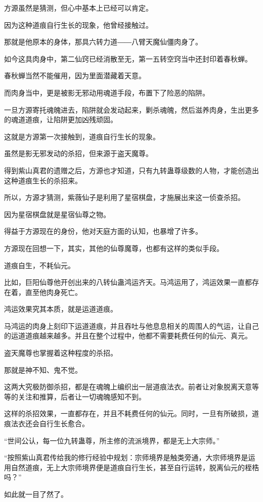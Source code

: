 \begin{this_body}
方源虽然是猜测，但心中基本上已经可以肯定。

因为这种道痕自行生长的现象，他曾经接触过。

那就是他原本的身体，那具六转力道――八臂天魔仙僵肉身了。

如今这具肉身中，第二仙窍已经消散至无，第一五转空窍当中还封印着春秋蝉。

春秋蝉当然不能催用，因为里面潜藏着天意。

而肉身当中，更是被影无邪动用魂道手段，布置下了险恶的陷阱。

一旦方源寄托魂魄进去，陷阱就会发动起来，剿杀魂魄，然后滋养肉身，生出更多的魂道道痕，让陷阱更加凶残顽固。

这就是方源第一次接触到，道痕自行生长的现象。

虽然是影无邪发动的杀招，但来源于盗天魔尊。

得到紫山真君的遗赠之后，方源也才知道，只有九转蛊尊级数的人物，才能创造出这种道痕生长的杀招来。

所以，方源才猜测，紫薇仙子是利用了星宿棋盘，才施展出来这一侦查杀招。

因为星宿棋盘就是星宿仙尊之物。

得益于方源现在的身份，他对天庭方面的认知，也暴增了许多。

方源现在回想一下，其实，其他的仙尊魔尊，也都有这样的类似手段。

道痕自生，不耗仙元。

比如，巨阳仙尊他开创出来的八转仙蛊鸿运齐天。马鸿运用了，鸿运效果一直都存在着，直至他肉身死亡。

鸿运效果究其本质，就是运道道痕。

马鸿运的肉身上刻印下运道道痕，并且吞吐与他息息相关的周围人的气运，让自己的运道道痕越来越多。并且在整个过程中，他都不需要耗费任何的仙元、真元。

盗天魔尊也掌握着这种程度的杀招。

那就是神不知、鬼不觉。

这两大究极防御杀招，都是在魂魄上编织出一层道痕法衣。前者让对象脱离天意等等的关注和推算，后者让一切魂魄感知不到。

这样的杀招效果，一直都存在，并且不耗费任何的仙元。同时，一旦有所破损，道痕法衣还会自行生长愈合。

“世间公认，每一位九转蛊尊，所主修的流派境界，都是无上大宗师。”

“按照紫山真君传给我的修行经验中规划：宗师境界是触类旁通，大宗师境界是运用自然道痕，无上大宗师境界便是道痕自行生长，甚至自行运转，脱离仙元的桎梏吗？”

如此就一目了然了。


\end{this_body}
